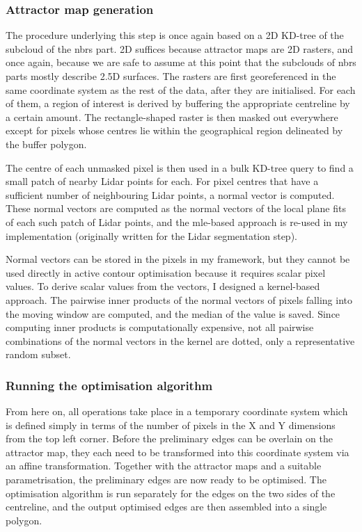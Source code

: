 \subsubsection{Attractor map generation}

The procedure underlying this step is once again based on a 2D KD-tree of the subcloud of the \ac{nbrs} part. 2D suffices because attractor maps are 2D rasters, and once again, because we are safe to assume at this point that the subclouds of \ac{nbrs} parts mostly describe 2.5D surfaces. The rasters are first georeferenced in the same coordinate system as the rest of the data, after they are initialised. For each of them, a region of interest is derived by buffering the appropriate centreline by a certain amount. The rectangle-shaped raster is then masked out everywhere except for pixels whose centres lie within the geographical region delineated by the buffer polygon.

The centre of each unmasked pixel is then used in a bulk KD-tree query to find a small patch of nearby Lidar points for each. For pixel centres that have a sufficient number of neighbouring Lidar points, a normal vector is computed. These normal vectors are computed as the normal vectors of the local plane fits of each such patch of Lidar points, and the \ac{mle}-based approach is re-used in my implementation (originally written for the Lidar segmentation step).

Normal vectors can be stored in the pixels in my framework, but they cannot be used directly in active contour optimisation because it requires scalar pixel values. To derive scalar values from the vectors, I designed a kernel-based approach. The pairwise inner products of the normal vectors of pixels falling into the moving window are computed, and the median of the value is saved. Since computing inner products is computationally expensive, not all pairwise combinations of the normal vectors in the kernel are dotted, only a representative random subset.

\subsubsection{Running the optimisation algorithm}

From here on, all operations take place in a temporary coordinate system which is defined simply in terms of the number of pixels in the X and Y dimensions from the top left corner. Before the preliminary edges can be overlain on the attractor map, they each need to be transformed into this coordinate system via an affine transformation. Together with the attractor maps and a suitable parametrisation, the preliminary edges are now ready to be optimised. The optimisation algorithm is run separately for the edges on the two sides of the centreline, and the output optimised edges are then assembled into a single polygon.

